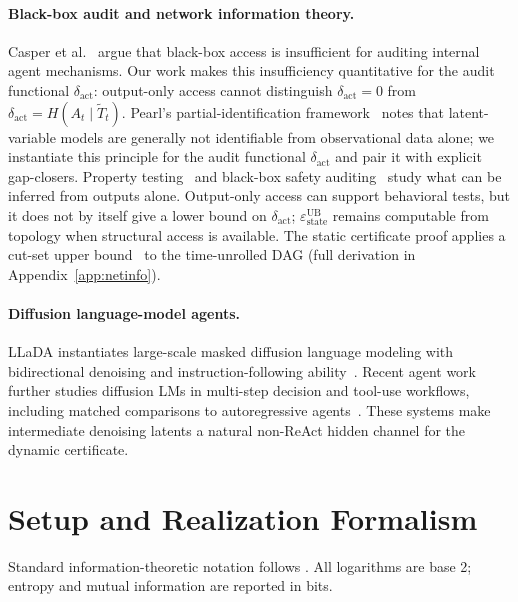 \documentclass{article}
\begin{document}
\paragraph{Black-box audit and network information theory.}
Casper et al.~\citep{casper2024blackbox} argue that black-box access is insufficient for auditing internal agent mechanisms. Our work makes this insufficiency quantitative for the audit functional $\delta_\text{act}$: output-only access cannot distinguish $\delta_\text{act}=0$ from $\delta_\text{act}=H(A_t\mid\tilde T_t)$. Pearl's partial-identification framework~\citep{pearl2009causality} notes that latent-variable models are generally not identifiable from observational data alone; we instantiate this principle for the audit functional $\delta_\text{act}$ and pair it with explicit gap-closers. Property testing~\citep{goldreich1998property} and black-box safety auditing~\citep{su2024mission} study what can be inferred from outputs alone. Output-only access can support behavioral tests, but it does not by itself give a lower bound on $\delta_\text{act}$; $\varepsilon_\text{state}^\text{UB}$ remains computable from topology when structural access is available. The static certificate proof applies a cut-set upper bound~\citep{elgamal2011network} to the time-unrolled DAG (full derivation in Appendix~\ref{app:netinfo}).

\paragraph{Diffusion language-model agents.}
LLaDA instantiates large-scale masked diffusion language modeling with bidirectional denoising and instruction-following ability~\citep{nie2025llada}. Recent agent work further studies diffusion LMs in multi-step decision and tool-use workflows, including matched comparisons to autoregressive agents~\citep{zhen2026dllmagent}. These systems make intermediate denoising latents a natural non-ReAct hidden channel for the dynamic certificate.

\section{Setup and Realization Formalism}
\label{sec:setup}

Standard information-theoretic notation follows \citet{cover2006elements}. All logarithms are base 2; entropy and mutual information are reported in bits.
\end{document}
